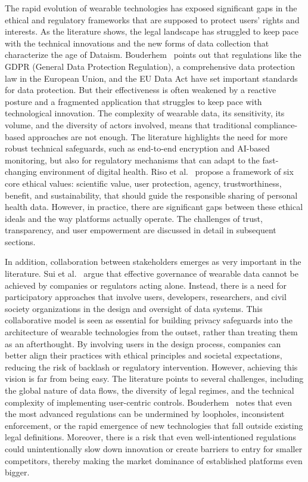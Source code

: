 	The rapid evolution of wearable technologies has exposed significant gaps in the ethical and regulatory frameworks that are supposed to protect users’ rights and interests. As the literature shows, the legal landscape has struggled to keep pace with the technical innovations and the new forms of data collection that characterize the age of Dataism. Bouderhem~\cite{Bouderhem2023} points out that regulations like the GDPR (General Data Protection Regulation), a comprehensive data protection law in the European Union, and the EU Data Act have set important standards for data protection. But their effectiveness is often weakened by a reactive posture and a fragmented application that struggles to keep pace with technological innovation. The complexity of wearable data, its sensitivity, its volume, and the diversity of actors involved, means that traditional compliance-based approaches are not enough. The literature highlights the need for more robust technical safeguards, such as end-to-end encryption and AI-based monitoring, but also for regulatory mechanisms that can adapt to the fast-changing environment of digital health. Riso et al.~\cite{Riso2017} propose a framework of six core ethical values: scientific value, user protection, agency, trustworthiness, benefit, and sustainability, that should guide the responsible sharing of personal health data. However, in practice, there are significant gaps between these ethical ideals and the way platforms actually operate. The challenges of trust, transparency, and user empowerment are discussed in detail in subsequent sections.

	In addition, collaboration between stakeholders emerges as very important in the literature. Sui et al.~\cite{Sui2023} argue that effective governance of wearable data cannot be achieved by companies or regulators acting alone. Instead, there is a need for participatory approaches that involve users, developers, researchers, and civil society organizations in the design and oversight of data systems. This collaborative model is seen as essential for building privacy safeguards into the architecture of wearable technologies from the outset, rather than treating them as an afterthought. By involving users in the design process, companies can better align their practices with ethical principles and societal expectations, reducing the risk of backlash or regulatory intervention. However, achieving this vision is far from being easy. The literature points to several challenges, including the global nature of data flows, the diversity of legal regimes, and the technical complexity of implementing user-centric controls. Bouderhem~\cite{Bouderhem2023} notes that even the most advanced regulations can be undermined by loopholes, inconsistent enforcement, or the rapid emergence of new technologies that fall outside existing legal definitions. Moreover, there is a risk that even well-intentioned regulations could unintentionally slow down innovation or create barriers to entry for smaller competitors, thereby making the market dominance of established platforms even bigger.

